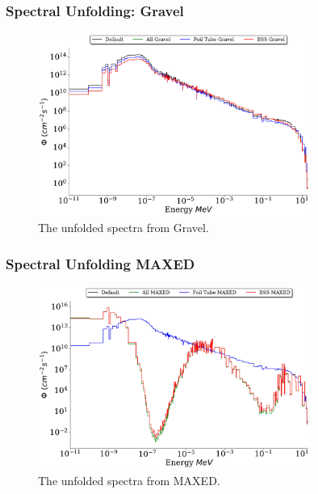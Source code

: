 \documentclass[fleqn]{beamer}
\begin{document}
\begin{frame}
\frametitle{Spectral Unfolding: Gravel}

\begin{figure}
\centering
\includegraphics[width = 0.8\textwidth]{unfolded_gr}
\caption{The unfolded spectra from Gravel.}
\end{figure}

\end{frame}

\begin{frame}
\frametitle{Spectral Unfolding MAXED}

\begin{figure}
\centering
\includegraphics[width = 0.8\textwidth]{unfolded_mx}
\caption{The unfolded spectra from MAXED.}
\end{figure}

\end{frame}
\end{document}
